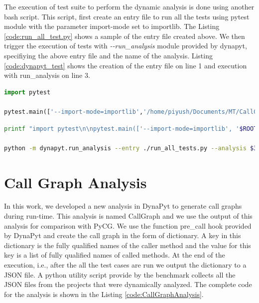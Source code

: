 The execution of test suite to perform the dynamic analysis is done using another bash script.
This script, first create an entry file to run all the tests using pytest module with the parameter import-mode set to importlib.
The Listing \ref{code:run_all_test.py} shows a sample of the entry file created above.
We then trigger the execution of tests with \textit{\--\--run\_analysis} module provided by dynapyt, specifiying the above entry file and the name of the analysis.
Listing \ref{code:dynapyt_test} shows the creation of the entry file on line 1 and execution with run\_analysis on line 3.
\begin{lstlisting}[caption=DynaPyt Execution Entry File,label=code:run_all_test.py,language=Python]
import pytest

pytest.main(['--import-mode=importlib','/home/piyush/Documents/MT/CallGraph/flask-api/flask_api/tests/'])
\end{lstlisting}
\begin{lstlisting}[caption=DynaPyt Test Suite Execution,label=code:dynapyt_test,language=Bash]
printf "import pytest\n\npytest.main(['--import-mode=importlib', '$ROOT_DIR/temp/project$2/$4'])\n" > run_all_tests.py

python -m dynapyt.run_analysis --entry ./run_all_tests.py --analysis $3
\end{lstlisting}

\section{Call Graph Analysis}
\label{impl:Call Graph Analysis}
In this work, we developed a new analysis in DynaPyt to generate call graphs during run-time.
This analysis is named CallGraph and we use the output of this analysis for comparison with PyCG.
We use the function pre\_call hook provided by DynaPyt and create the call graph in the form of dictionary.
A key in this dictionary is the fully qualified names of the caller method and the value for this key is a list of fully qualified names of called methods.
At the end of the execution, i.e., after the all the test cases are run we output the dictionary to a JSON file.
A python utility script provide by the benchmark collects all the JSON files from the projects that were dynamically analyzed.
The complete code for the analysis is shown in the Listing \ref{code:CallGraphAnalysis}.
